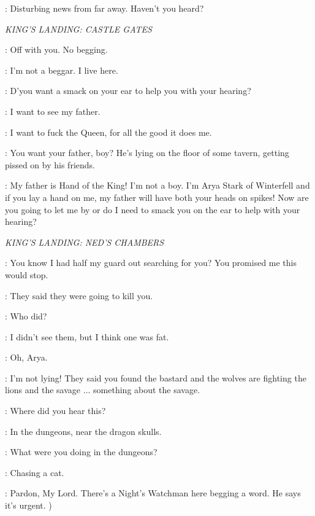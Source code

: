 \VARYS: Disturbing news from far away. Haven't you heard? 

\scene

\textit{KING'S LANDING: CASTLE GATES} 


\GUARDa: Off with you. No begging. 

\ARYA: I'm not a beggar. I live here. 

\GUARDa: D'you want a smack on your ear to help you with your hearing? 

\ARYA: I want to see my father. 

\GUARDb: I want to fuck the Queen, for all the good it does me. 

\GUARDa: You want your father, boy? He's lying on the floor of some tavern, getting pissed on by his friends. 

\ARYA: My father is Hand of the King! I'm not a boy. I'm Arya Stark of Winterfell and if you lay a hand on me, my father will have both your heads on spikes! Now are you going to let me by or do I need to smack you on the ear to help with your hearing? 


\scene

\textit{KING'S LANDING: NED'S CHAMBERS} 


\NED: You know I had half my guard out searching for you? You promised me this would stop. 

\ARYA: They said they were going to kill you. 

\NED: Who did? 

\ARYA: I didn't see them, but I think one was fat. 

\NED: Oh, Arya. 

\ARYA: I'm not lying! They said you found the bastard and the wolves are fighting the lions and the savage $\ldots$ something about the savage. 

\NED: Where did you hear this? 

\ARYA: In the dungeons, near the dragon skulls. 

\NED: What were you doing in the dungeons? 

\ARYA: Chasing a cat. 


\JORY: Pardon, My Lord. There's a Night's Watchman here begging a word. He says it's urgent. ) 

